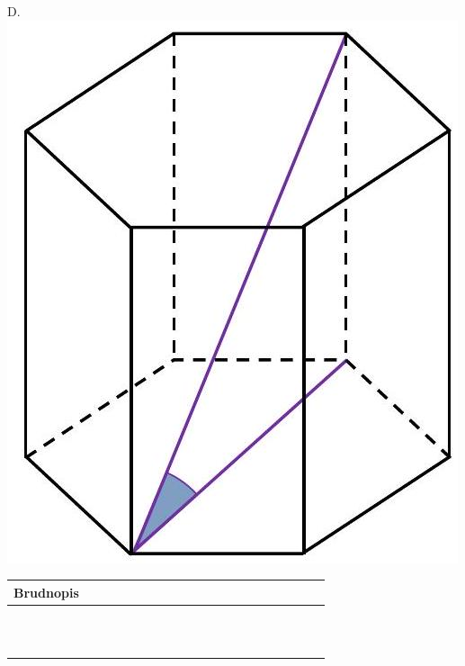 \documentclass[10pt]{article}
\begin{document}
D.\\
\includegraphics[max width=\textwidth, center]{2024_11_21_daeb5e5efb43dd4cb535g-23}

\begin{center}
\begin{tabular}{|c|c|c|c|c|c|c|c|c|c|c|c|c|c|c|c|c|c|c|c|c|c|c|}
\hline
\multicolumn{4}{|l|}{Brudnopis} &  &  &  &  &  &  &  &  &  &  &  &  &  &  &  &  &  &  &  \\
\hline
 &  &  &  &  &  &  &  &  &  &  &  &  &  &  &  &  &  &  &  &  &  &  \\
\hline
 &  &  &  &  &  &  &  &  &  &  &  &  &  &  &  &  &  &  &  &  &  &  \\
\hline
 &  &  &  &  &  &  &  &  &  &  &  &  &  &  &  &  &  &  &  &  &  &  \\
\hline
 &  &  &  &  &  &  &  &  &  &  &  &  &  &  &  &  &  &  &  &  &  &  \\
\hline
 &  &  &  &  &  &  &  &  &  &  &  &  &  &  &  &  &  &  &  &  &  &  \\
\hline
 &  &  &  &  &  &  &  &  &  &  &  &  &  &  &  &  &  &  &  &  &  &  \\
\hline
 &  &  &  &  &  &  &  &  &  &  &  &  &  &  &  &  &  &  &  &  &  &  \\
\hline
 &  &  &  &  &  &  &  &  &  &  &  &  &  &  &  &  &  &  &  &  &  &  \\
\hline
 &  &  &  &  &  &  &  &  &  &  &  &  &  &  &  &  &  &  &  &  &  &  \\
\hline
 &  &  &  &  &  &  &  &  &  &  &  &  &  &  &  &  &  &  &  &  &  &  \\
\hline
 &  &  &  &  &  &  &  &  &  &  &  &  &  &  &  &  &  &  &  &  &  &  \\
\hline
\end{tabular}
\end{center}
\end{document}

